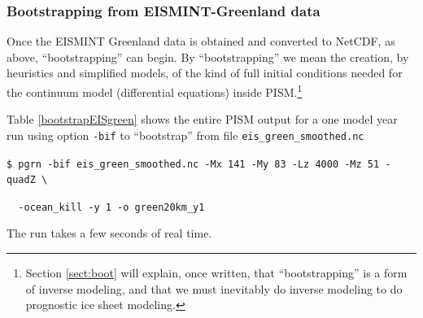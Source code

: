 \documentclass[11pt,final]{amsart}
\begin{document}
\subsubsection*{Bootstrapping from EISMINT-Greenland data}  Once the EISMINT Greenland data is obtained and converted to NetCDF, as above, ``bootstrapping'' can begin.  By ``bootstrapping'' we mean the creation, by heuristics and simplified models, of the kind of full initial conditions needed for the continuum model (differential equations) inside PISM.\footnote{Section \ref{sect:boot} will explain, once written, that ``bootstrapping'' is a form of inverse modeling, and that we must inevitably do inverse modeling to do prognostic ice sheet modeling.}

Table \ref{bootstrapEISgreen} shows the entire PISM output for a one model year run using option \verb|-bif| to ``bootstrap'' from file \verb|eis_green_smoothed.nc|

\verb|$ pgrn -bif eis_green_smoothed.nc -Mx 141 -My 83 -Lz 4000 -Mz 51 -quadZ \|

\verb|  -ocean_kill -y 1 -o green20km_y1|

\noindent The run takes a few seconds of real time.
\end{document}
